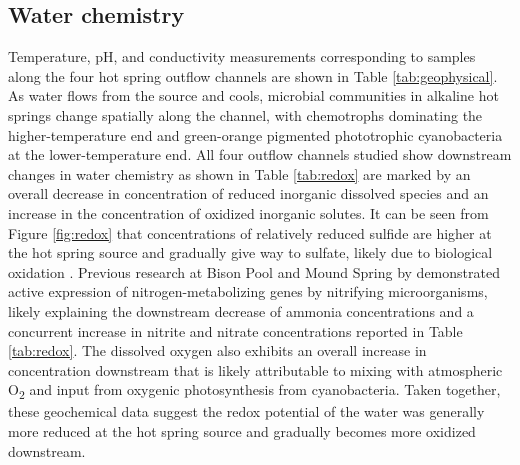 \subsection{Water chemistry}
Temperature, pH, and conductivity measurements corresponding to samples along the four hot spring outflow channels are shown in Table \ref{tab:geophysical}. As water flows from the source and cools, microbial communities in alkaline hot springs change spatially along the channel, with chemotrophs dominating the higher-temperature end and green-orange pigmented phototrophic cyanobacteria at the lower-temperature end. All four outflow channels studied show downstream changes in water chemistry as shown in Table \ref{tab:redox} are marked by an overall decrease in concentration of reduced inorganic dissolved species and an increase in the concentration of oxidized inorganic solutes. It can be seen from Figure \ref{fig:redox} that concentrations of relatively reduced sulfide are higher at the hot spring source and gradually give way to sulfate, likely due to biological oxidation \citep{cox2011transition}. Previous research at Bison Pool and Mound Spring by \cite{loiacono2012evidence} demonstrated active expression of nitrogen-metabolizing genes by nitrifying microorganisms, likely explaining the downstream decrease of ammonia concentrations and a concurrent increase in nitrite and nitrate concentrations reported in Table \ref{tab:redox}. The dissolved oxygen also exhibits an overall increase in concentration downstream that is likely attributable to mixing with atmospheric O\textsubscript{2} and input from oxygenic photosynthesis from cyanobacteria. Taken together, these geochemical data suggest the redox potential of the water was generally more reduced at the hot spring source and gradually becomes more oxidized downstream.


